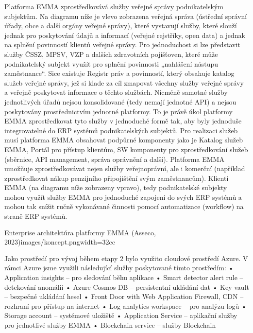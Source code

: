 Platforma EMMA zprostředkovává služby veřejné správy podnikatelským subjektům. Na diagramu níže je 
vlevo zobrazena veřejná správa (ústřední správní úřady, obce a další orgány veřejné správy), které 
vystavují služby, které slouží jednak pro poskytování údajů a informací (veřejné rejstříky, open data) a 
jednak na splnění povinností klientů veřejné správy. Pro jednoduchost si lze představit služby ČSSZ, MPSV, 
VZP a dalších zdravotních pojišťoven, které může podnikatelský subjekt využít pro splnění povinnosti 
„nahlášení nástupu zaměstnance“. Sice existuje Registr práv a povinností, který obsahuje katalog služeb 
veřejné správy, jež si klade za cíl zmapovat všechny služby veřejné správy a veřejně poskytovat informace 
o těchto službách. Nicméně samotné služby jednotlivých úřadů nejsou konsolidované (tedy nemají 
jednotné API) a nejsou poskytovány prostřednictvím jednotné platformy. To je právě úkol platformy 
EMMA zprostředkovat tyto služby v jednoduché formě tak, aby byly jednoduše integrovatelné do ERP 
systémů podnikatelských subjektů. Pro realizaci služeb musí platforma EMMA obsahovat podpůrné 
komponenty jako je Katalog služeb EMMA, Portál pro přístup klientům, SW komponenty pro 
zprostředkování služeb (sběrnice, API management, správa oprávnění a další). Platforma EMMA 
umožňuje zprostředkovávat nejen služby veřejnoprávní, ale i komerční (například zprostředkovat nákup 
penzijního připojištění svým zaměstnancům). Klienti EMMA (na diagramu níže zobrazeny vpravo), tedy 
podnikatelské subjekty mohou využít služby EMMA pro jednoduché zapojení do svých ERP systémů a 
mohou tak snížit ručně vykonávané činnosti pomocí automatizace (workflow) na straně ERP systémů. 


{Enterprise architektúra platformy EMMA  (Asseco, 2023)}{images/koncept.png}{width=32cc}

Jako prostředí pro vývoj během etapy 2 bylo využito cloudové prostředí Azure.
V rámci Azure jsme využili následující služby poskytované tímto prostředím:
• Application insights – pro sledování běhu aplikace
• Smart detector alert rule – detekování anomálií 
• Azure Cosmos DB – persistentní ukládání dat
• Key vault – bezpečné ukládání hesel
• Front Door with Web Application Firewall, CDN – rozhraní pro přístup na internet
• Log analytics workspace – pro analýzu logů
• Storage account – systémové uložiště
• Application Service – aplikační služby pro jednotlivé služby EMMA
• Blockchain service – služby Blockchain


